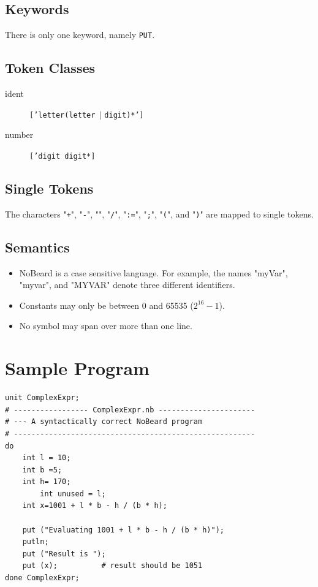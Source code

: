 \documentclass[11pt]{report}
\newcommand{\leongage}{NoBeard}
\newcommand{\alternative}{$\mid \;$}
\begin{document}
\subsection{Keywords}
There is only one keyword, namely \texttt{PUT}.

\subsection{Token Classes}
\begin{description}
	\item[ident] \texttt{['letter(letter \alternative digit)*']}
	\item[number] \texttt{['digit digit*]}
\end{description}

\subsection{Single Tokens}
The characters "{\tt+}", "{\tt-}", "{\tt*}", "{\tt/}", "{\tt:=}", "{\tt;}", "{\tt(}", and "{\tt)}" are mapped to single tokens.

\subsection{Semantics}
\begin{itemize}
	\item \leongage{} is a case sensitive language. For example, the names "myVar", "myvar", and "MYVAR" denote three different identifiers.
	\item Constants may only be between 0 and 65535 ($2^{16} - 1$).
	\item No symbol may span over more than one line.
\end{itemize}

\section{Sample Program}
\lstset{language=NoBeard}

\begin{lstlisting}
unit ComplexExpr;
# ----------------- ComplexExpr.nb ----------------------
# --- A syntactically correct NoBeard program
# -------------------------------------------------------
do
    int l = 10;
    int b =5;
    int h= 170;
        int unused = l;
    int x=1001 + l * b - h / (b * h);

    put ("Evaluating 1001 + l * b - h / (b * h)");
    putln;
    put ("Result is ");
    put (x);          # result should be 1051
done ComplexExpr;
\end{lstlisting}
\end{document}

